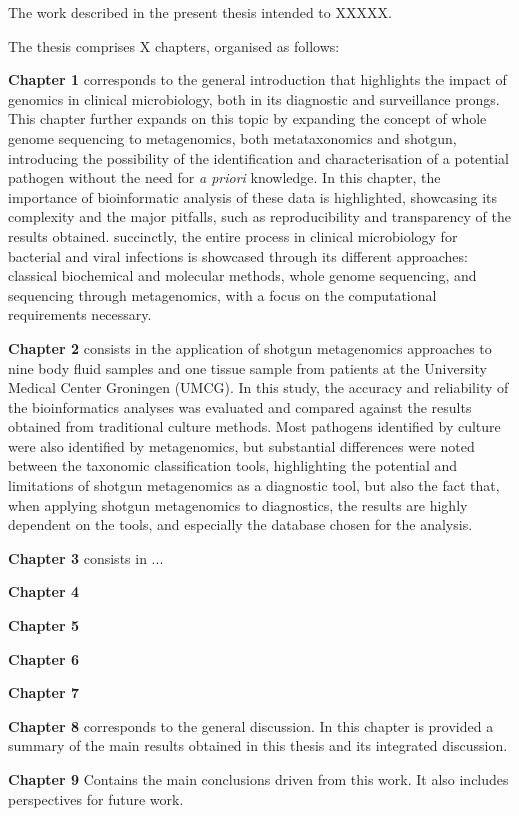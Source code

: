 The work described in the present thesis intended to XXXXX.

The thesis comprises X chapters, organised as follows:

\textbf{Chapter 1} corresponds to the general introduction that highlights the impact of genomics in clinical microbiology, both in its diagnostic and surveillance prongs. This chapter further expands on this topic by expanding the concept of whole genome sequencing to metagenomics, both metataxonomics and shotgun, introducing the possibility of the identification and characterisation of a potential pathogen without the need for \textit{a priori} knowledge. In this chapter, the importance of bioinformatic analysis of these data is highlighted, showcasing its complexity and the major pitfalls, such as reproducibility and transparency of the results obtained. succinctly, the entire process in clinical microbiology for bacterial and viral infections is showcased through its different approaches: classical biochemical and molecular methods, whole genome sequencing, and sequencing through metagenomics, with a focus on the computational requirements necessary. 

\textbf{Chapter 2} consists in the application of shotgun metagenomics approaches to  nine body fluid samples and one tissue sample from patients at the University Medical Center Groningen (UMCG). In this study, the accuracy and reliability of the bioinformatics analyses was evaluated and compared against the results obtained from traditional culture methods. Most pathogens identified by culture were also identified by metagenomics, but substantial differences were noted between the taxonomic classification tools, highlighting the potential and limitations of shotgun metagenomics as a diagnostic tool, but also the fact that, when applying shotgun metagenomics to diagnostics, the results are highly dependent on the tools, and especially the database chosen for the analysis.

\textbf{Chapter 3} consists in ...

\textbf{Chapter 4}

\textbf{Chapter 5}

\textbf{Chapter 6}

\textbf{Chapter 7}

\textbf{Chapter 8} corresponds to the general discussion. In this chapter is provided a
summary of the main results obtained in this thesis and its integrated discussion. 

\textbf{Chapter 9} Contains the main conclusions driven from this work. It also includes perspectives for future work. 